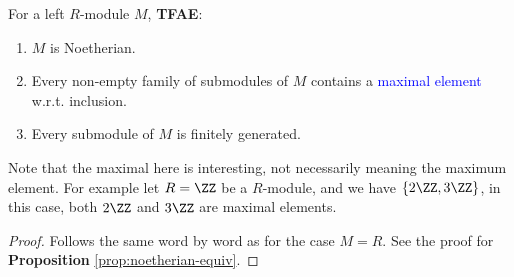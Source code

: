 \begin{proposition}
	For a left \( R \)-module \( M \), \textbf{TFAE}:
	\begin{enumerate}
		\item \( M \) is Noetherian.
		\item Every non-empty family of submodules of \( M \) contains a \textcolor{blue}{maximal element} w.r.t.
		      inclusion.
		\item Every submodule of \( M \) is finitely generated.
	\end{enumerate}
\end{proposition}

\begin{note}
	Note that the maximal here is interesting, not necessarily meaning the maximum element. For
	example let \( R = \ZZ \) be a \( R \)-module, and we have \( \{2\ZZ, 3\ZZ\} \), in this case,
	both \( 2\ZZ \) and \( 3\ZZ \) are maximal elements.
\end{note}

\begin{proof}
	Follows the same word by word as for the case \( M = R \). See the proof for \textbf{Proposition}
	\ref{prop:noetherian-equiv}.
\end{proof}
